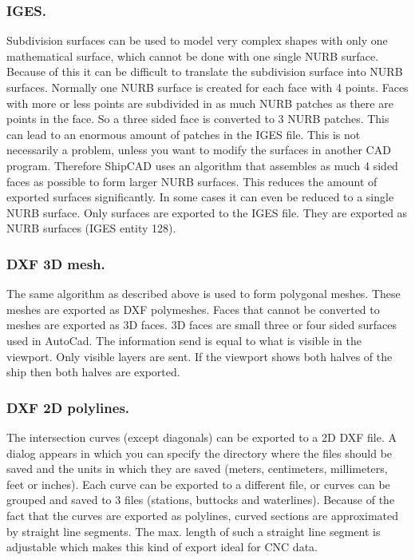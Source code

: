 \documentclass[12pt]{article}
\begin{document}
\subsubsection{IGES.}
Subdivision surfaces can be used to model very complex shapes with only one mathematical
surface, which cannot be done with one single NURB surface. Because of this it can be difficult to
translate the subdivision surface into NURB surfaces. Normally one NURB surface is created for
each face with 4 points. Faces with more or less points are subdivided in as much NURB patches
as there are points in the face. So a three sided face is converted to 3 NURB patches. This can lead
to an enormous amount of patches in the IGES file. This is not necessarily a problem, unless you
want to modify the surfaces in another CAD program. Therefore ShipCAD uses an algorithm that
assembles as much 4 sided faces as possible to form larger NURB surfaces. This reduces the
amount of exported surfaces significantly. In some cases it can even be reduced to a single NURB
surface. Only surfaces are exported to the IGES file. They are exported as NURB surfaces (IGES
entity 128).

\subsubsection{DXF 3D mesh.}
The same algorithm as described above is used to form polygonal meshes. These meshes are
exported as DXF polymeshes. Faces that cannot be converted to meshes are exported as 3D
faces. 3D faces are small three or four sided surfaces used in AutoCad. The information send is
equal to what is visible in the viewport. Only visible layers are sent. If the viewport shows both
halves of the ship then both halves are exported.

\subsubsection{DXF 2D polylines.}
The intersection curves (except diagonals) can be exported to a 2D DXF file. A dialog appears in
which you can specify the directory where the files should be saved and the units in which they are
saved (meters, centimeters, millimeters, feet or inches). Each curve can be exported to a different
file, or curves can be grouped and saved to 3 files (stations, buttocks and waterlines). Because of
the fact that the curves are exported as polylines, curved sections are approximated by straight line
segments. The max. length of such a straight line segment is adjustable which makes this kind of
export ideal for CNC data.
\end{document}
